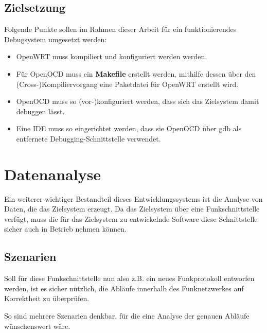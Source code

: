 \subsection{Zielsetzung}
\begin{minipage}[c]{\textwidth}
Folgende Punkte sollen im Rahmen dieser Arbeit für ein funktionierendes
Debugsystem umgesetzt werden:
\begin{itemize}
  \item OpenWRT muss kompiliert und konfiguriert werden werden.
  \item Für OpenOCD muss ein \textbf{Makefile} erstellt werden, mithilfe
  dessen über den \linebreak(Cross-)Kompiliervorgang eine Paketdatei für
  OpenWRT erstellt wird.
  \item OpenOCD muss so (vor-)konfiguriert werden, dass sich das Zielsystem
  damit debuggen lässt.
  \item Eine IDE muss so eingerichtet werden, dass sie OpenOCD über \gls{gdb}
  als entfernete Debugging-Schnittstelle verwendet.
\end{itemize}
\end{minipage}
\section{Datenanalyse}\label{sec:datenan}
Ein weiterer wichtiger Bestandteil dieses Entwicklungssystems ist die Analyse
von Daten, die das Zielsystem erzeugt. Da das Zielsystem über eine
Funkschnittstelle verfügt, muss die für das Zielsystem zu entwickelnde
Software diese Schnittstelle sicher auch in Betrieb nehmen können.
\subsection{Szenarien}
Soll für diese Funkschnittstelle nun also z.B. ein neues Funkprotokoll entworfen
werden, ist es sicher nützlich, die Abläufe innerhalb des Funknetzwerkes auf
Korrektheit zu überprüfen.

So sind mehrere Szenarien denkbar, für die eine Analyse der genauen Abläufe
wünschenswert wäre.

